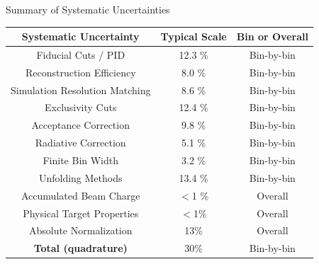 \documentclass[aspectratio=169]{beamer}
\begin{document}
\begin{frame}{Summary of Systematic Uncertainties}
    \begin{table}[H]
        \centering
        \begin{tabular}{|ccc|}
        \hline
        Systematic Uncertainty & Typical Scale & Bin or Overall \\ 
        \hline
            Fiducial Cuts / PID              & 12.3 \%    & Bin-by-bin   \\ 
        \hline
            Reconstruction Efficiency       & 8.0 \%       & Bin-by-bin   \\ 
        \hline
            Simulation Resolution Matching    & 8.6 \%       & Bin-by-bin   \\ 
        \hline
            Exclusivity Cuts            & 12.4 \%      & Bin-by-bin   \\ 
        \hline
            Acceptance Correction       & 9.8 \%       & Bin-by-bin   \\ 
        \hline
            Radiative Correction        & 5.1 \%       & Bin-by-bin   \\ 
        \hline
            Finite Bin Width            & 3.2 \%       & Bin-by-bin   \\
        \hline
            Unfolding Methods            & 13.4 \%       & Bin-by-bin   \\ 
        \hline
            Accumulated Beam Charge     & $<$1 \%        & Overall      \\ 
        \hline
            Physical Target Properties  & $<$1\%    & Overall      \\
        \hline
            Absolute Normalization      & 13\%       & Overall      \\ 
            \hline
            \textbf{Total (quadrature)}          & 30\%     & Bin-by-bin      \\ 
                \hline
        \end{tabular}
    \end{table}

\end{frame}
\end{document}
